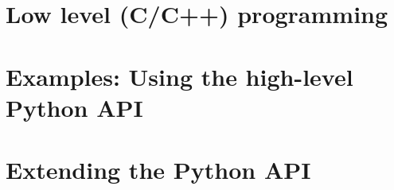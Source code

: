 \documentclass[11pt,fleqn]{book}
\begin{document}
 

 \thispagestyle{empty}
 \newpage
 \cleardoublepage 

 \pagestyle{plain}
 

 \cleardoublepage 
 
 \tableofcontents

 \newpage

 \cleardoublepage 

 \pagestyle{plain}
 
 
 
 
 
 \part{Low level (C/C++) programming}
 
 \newpage
 
 \newpage
 
 \newpage
 


 \part{Examples: Using the high-level Python API}
 \newpage
 
 \newpage
 

%   
% 
% 
 \part{Extending the Python API}
 \newpage
 
 
% 
% 
%   
% 
%   
%   
%   
% 
% 
%  
%   
%   
%   
% 
% 
% 
%   
%   
%   
%   
%   
%   
%   
%   
%   
%  
%
\end{document}

